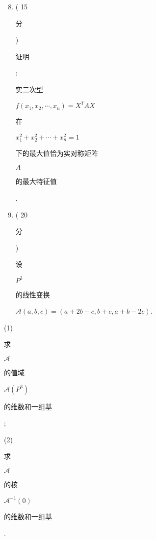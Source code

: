 \documentclass[10pt]{article}
\begin{document}
\begin{enumerate}
  \setcounter{enumi}{7}
  \item ( 15 \begin{CJK}{UTF8}{mj}分\end{CJK}) \begin{CJK}{UTF8}{mj}证明\end{CJK}: \begin{CJK}{UTF8}{mj}实二次型\end{CJK} $f\left(x_{1}, x_{2}, \cdots, x_{n}\right)=X^{T} A X$ \begin{CJK}{UTF8}{mj}在\end{CJK} $x_{1}^{2}+x_{2}^{2}+\cdots+x_{n}^{2}=1$ \begin{CJK}{UTF8}{mj}下的最大值恰为实对称矩阵\end{CJK} $A$ \begin{CJK}{UTF8}{mj}的最大特征值\end{CJK}.

  \item ( 20 \begin{CJK}{UTF8}{mj}分\end{CJK}) \begin{CJK}{UTF8}{mj}设\end{CJK} $P^{3}$ \begin{CJK}{UTF8}{mj}的线性变换\end{CJK} $\mathcal{A}(a, b, c)=(a+2 b-c, b+c, a+b-2 c)$.

\end{enumerate}
(1) \begin{CJK}{UTF8}{mj}求\end{CJK} $\mathcal{A}$ \begin{CJK}{UTF8}{mj}的值域\end{CJK} $\mathcal{A}\left(P^{3}\right)$ \begin{CJK}{UTF8}{mj}的维数和一组基\end{CJK};

(2) \begin{CJK}{UTF8}{mj}求\end{CJK} $\mathcal{A}$ \begin{CJK}{UTF8}{mj}的核\end{CJK} $\mathcal{A}^{-1}(0)$ \begin{CJK}{UTF8}{mj}的维数和一组基\end{CJK}.
\end{document}
